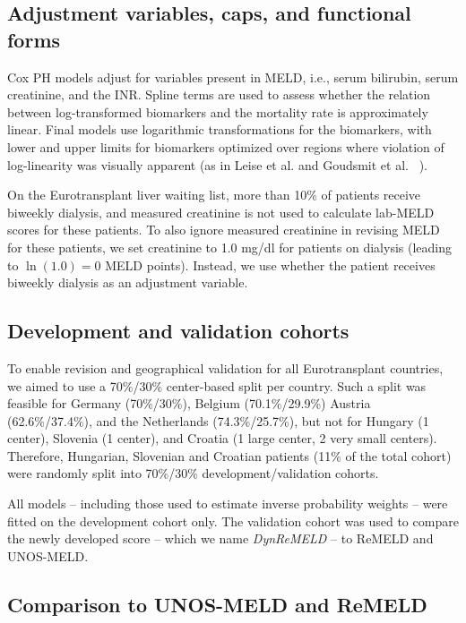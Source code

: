 \documentclass[11pt,twoside,]{book}
\begin{document}
\vfill

\subsection{Adjustment variables, caps, and functional forms}\label{adjustment-variables-caps-and-functional-forms}

Cox PH models adjust for variables present in MELD, i.e., serum bilirubin,
serum creatinine, and the INR. Spline terms are used to assess
whether the relation between log-transformed biomarkers and the
mortality rate is approximately linear. Final models use
logarithmic transformations for the biomarkers, with lower and upper
limits for biomarkers optimized over regions where violation of
log-linearity was visually apparent (as in
Leise et al. \citep{leiseRevisedModelEndstage2011} and Goudsmit et al.~
\citep{goudsmitRefittingModelEndstage2020}).

On the Eurotransplant liver waiting list, more than 10\% of patients receive biweekly dialysis, and
measured creatinine is not used to calculate lab-MELD scores for these patients.
To also ignore measured creatinine in revising MELD for these patients, we set
creatinine to 1.0 mg/dl for patients on dialysis (leading to \(\ln(1.0) = 0\) MELD points).
Instead, we use whether the patient receives biweekly dialysis as an adjustment variable.

\subsection{Development and validation cohorts}\label{development-and-validation-cohorts}

To enable revision and geographical validation for all Eurotransplant countries,
we aimed to use a 70\%/30\% center-based split per country. Such a
split was feasible for Germany (70\%/30\%), Belgium (70.1\%/29.9\%)
Austria (62.6\%/37.4\%), and the Netherlands (74.3\%/25.7\%), but not for
Hungary (1 center), Slovenia (1 center), and Croatia (1 large center, 2
very small centers). Therefore, Hungarian, Slovenian and Croatian
patients (11\% of the total cohort) were randomly split into 70\%/30\%
development/validation cohorts.

All models -- including those used to estimate inverse probability
weights -- were fitted on the development cohort only. The validation
cohort was used to compare the newly developed score -- which we name \emph{DynReMELD} -- to
ReMELD and UNOS-MELD.

\subsection{Comparison to UNOS-MELD and ReMELD}\label{comparison-to-unos-meld-and-remeld}
\end{document}
